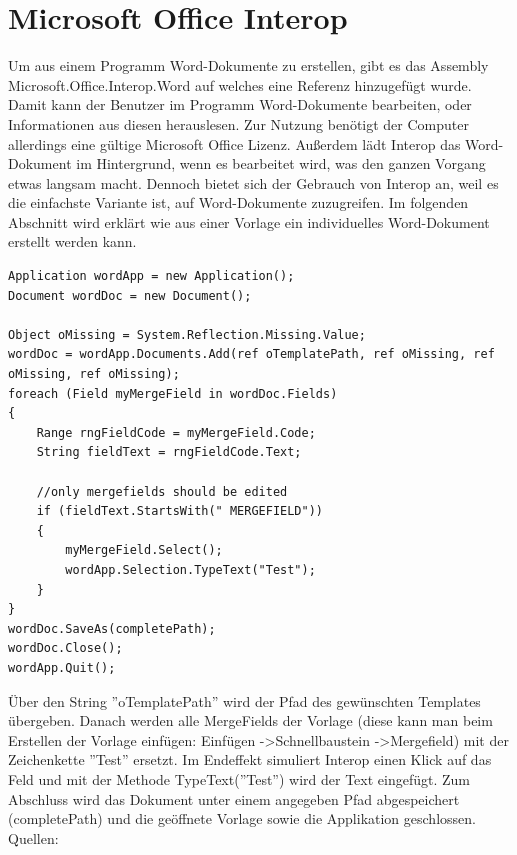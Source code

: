 \section{Microsoft Office Interop}
Um aus einem Programm Word-Dokumente zu erstellen, gibt es das Assembly Microsoft.Office.Interop.Word auf welches eine Referenz hinzugefügt wurde. Damit kann der Benutzer im Programm Word-Dokumente bearbeiten, oder Informationen aus diesen herauslesen. Zur Nutzung benötigt der Computer allerdings eine gültige Microsoft Office Lizenz.  Außerdem lädt Interop das Word-Dokument im Hintergrund, wenn es bearbeitet wird, was den ganzen Vorgang etwas langsam macht.
Dennoch bietet sich der Gebrauch von Interop an, weil es die einfachste Variante ist, auf Word-Dokumente zuzugreifen.
Im folgenden Abschnitt wird erklärt wie aus einer Vorlage ein individuelles Word-Dokument erstellt werden kann.
\begin{lstlisting}
Application wordApp = new Application();
Document wordDoc = new Document();

Object oMissing = System.Reflection.Missing.Value;
wordDoc = wordApp.Documents.Add(ref oTemplatePath, ref oMissing, ref oMissing, ref oMissing);
foreach (Field myMergeField in wordDoc.Fields)
{
	Range rngFieldCode = myMergeField.Code;
	String fieldText = rngFieldCode.Text;

	//only mergefields should be edited
	if (fieldText.StartsWith(" MERGEFIELD"))
	{
		myMergeField.Select();
		wordApp.Selection.TypeText("Test");
	}
}
wordDoc.SaveAs(completePath);
wordDoc.Close();
wordApp.Quit();
\end{lstlisting}
Über den String ''oTemplatePath'' wird der Pfad des gewünschten Templates übergeben. Danach werden alle MergeFields der Vorlage (diese kann man beim Erstellen der Vorlage einfügen: Einfügen -\textgreater Schnellbaustein -\textgreater Mergefield) mit der Zeichenkette ''Test'' ersetzt. Im Endeffekt simuliert Interop einen Klick auf das Feld und mit der Methode TypeText(''Test'') wird der Text eingefügt. Zum Abschluss wird das Dokument unter einem angegeben Pfad abgespeichert (completePath) und die geöffnete Vorlage sowie die Applikation geschlossen. \newline
Quellen: \cite{gembox_microsoft_2018}
